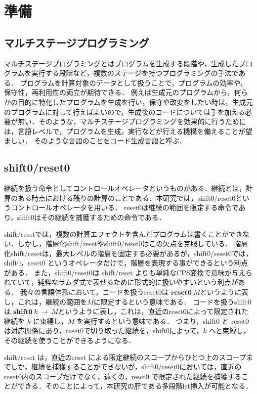 \documentclass[10pt,a4j,twocolumn]{jarticle}
\newcommand\cResetz{\underline{\textbf{reset0}}}
\newcommand\cShiftz{\underline{\textbf{shift0}}}
\theoremstyle{definition}
\begin{document}
\section{準備}
\subsection{マルチステージプログラミング}
マルチステージプログラミングとはプログラムを生成する段階や，生成したプログラムを実行する段階など，複数のステージを持つプログラミングの手法である．
プログラムを計算対象のデータとして扱うことで，プログラムの効率や，保守性，再利用性の両立が期待できる．
例えば生成元のプログラムから，何らかの目的に特化したプログラムを生成を行い，保守や改変をしたい時は，生成元のプログラムに対して行えばよいので，生成後のコードについては手を加える必要が無い．そのような，マルチステージプログラミングを効果的に行うためには，言語レベルで，プログラムを生成，実行などが行える機構を備えることが望ましい．
そのような言語のことをコード生成言語と呼ぶ．

\subsection{shift0/reset0}
継続を扱う命令としてコントロールオペレータというものがある．継続とは，計算のある時点における残りの計算のことである．本研究では，shift0/reset0というコントロールオペレータを用いる．
reset0は継続の範囲を限定する命令であり，shift0はその継続を捕獲するための命令である．

shift/reset\cite{Danvy1990}では，複数の計算エフェクトを含んだプログラムは書くことができない．しかし，階層化shift/resetやshift0/reset0はこの欠点を克服している．
階層化shift/reset\cite{Danvy1990}は，最大レベルの階層を固定する必要があるが，shift0/reset0では，shift0，reset0 というオペレータだけで，階層を表現する事ができるという利点がある．
また，shift0/reset0は shift/reset よりも単純なCPS変換で意味が与えられていて，純粋なラムダ式で表せるために形式的に扱いやすいという利点がある．
我々の言語体系において，コードを扱うreset0は $\cResetz ~M$というように表し，これは，継続の範囲を$M$に限定するという意味である．
コードを扱うshift0は $\cShiftz ~k ~\to ~M$というように表し，これは，直近のreset0によって限定された継続を $k$ に束縛し，$M$ を実行するという意味である．
つまり，shift0 と reset0 は対応関係にあり，reset0で切り取った継続を，shift0によって，$k$ へと束縛し，その継続を使うことができるようになる．

shift/reset\cite{Danvy1990} は，直近のreset による限定継続のスコープからひとつ上のスコープまでしか，継続を捕獲することができないが，shift0/reset0においては，直近の reset0内のスコープだけでなく，遠くの，reset0 で限定された継続を捕獲することができる．そのことによって，本研究の肝である多段階let挿入が可能となる．
\end{document}

